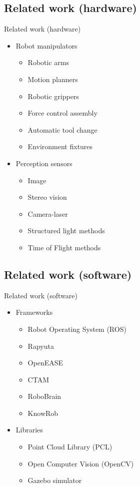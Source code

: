 \subsection{Related work (hardware)}
\begin{frame}{Related work (hardware)}
	\begin{itemize}
		\item Robot manipulators
		\begin{itemize}
			\item Robotic arms
			\item Motion planners
			\item Robotic grippers
			\item Force control assembly
			\item Automatic tool change
			\item Environment fixtures
		\end{itemize}
		\item Perception sensors
		\begin{itemize}
			\item Image
			\item Stereo vision
			\item Camera-laser
			\item Structured light methods
			\item Time of Flight methods
		\end{itemize}
	\end{itemize}
\end{frame}

\subsection{Related work (software)}
\begin{frame}{Related work (software)}
	\begin{itemize}
		\item Frameworks
		\begin{itemize}
			\item Robot Operating System (ROS)
			\item Rapyuta
			\item OpenEASE
			\item CTAM
			\item RoboBrain
			\item KnowRob
		\end{itemize}
		\item Libraries
		\begin{itemize}
			\item Point Cloud Library (PCL)
			\item Open Computer Vision (OpenCV)
			\item Gazebo simulator
		\end{itemize}
	\end{itemize}
\end{frame}


